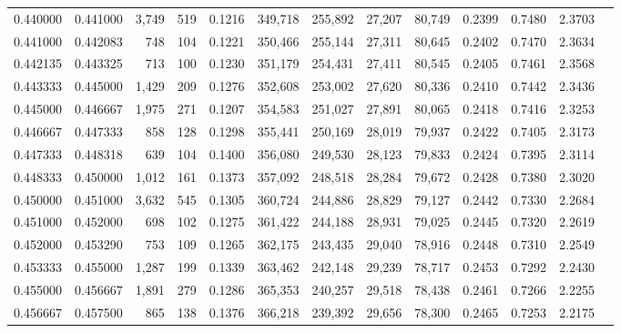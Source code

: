 \begin{tabular}{rrrrrrrrrrrrr}
0.440000 & 0.441000 & 3,749 & 519 &                                     0.1216 & 349,718 & 255,892 &  27,207 &  80,749 & 0.2399 & 0.7480 & 2.3703 \\
0.441000 & 0.442083 &   748 & 104 &                                     0.1221 & 350,466 & 255,144 &  27,311 &  80,645 & 0.2402 & 0.7470 & 2.3634 \\
0.442135 & 0.443325 &   713 & 100 &                                     0.1230 & 351,179 & 254,431 &  27,411 &  80,545 & 0.2405 & 0.7461 & 2.3568 \\
0.443333 & 0.445000 & 1,429 & 209 &                                     0.1276 & 352,608 & 253,002 &  27,620 &  80,336 & 0.2410 & 0.7442 & 2.3436 \\
0.445000 & 0.446667 & 1,975 & 271 &                                     0.1207 & 354,583 & 251,027 &  27,891 &  80,065 & 0.2418 & 0.7416 & 2.3253 \\
0.446667 & 0.447333 &   858 & 128 &                                     0.1298 & 355,441 & 250,169 &  28,019 &  79,937 & 0.2422 & 0.7405 & 2.3173 \\
0.447333 & 0.448318 &   639 & 104 &                                     0.1400 & 356,080 & 249,530 &  28,123 &  79,833 & 0.2424 & 0.7395 & 2.3114 \\
0.448333 & 0.450000 & 1,012 & 161 &                                     0.1373 & 357,092 & 248,518 &  28,284 &  79,672 & 0.2428 & 0.7380 & 2.3020 \\
0.450000 & 0.451000 & 3,632 & 545 &                                     0.1305 & 360,724 & 244,886 &  28,829 &  79,127 & 0.2442 & 0.7330 & 2.2684 \\
0.451000 & 0.452000 &   698 & 102 &                                     0.1275 & 361,422 & 244,188 &  28,931 &  79,025 & 0.2445 & 0.7320 & 2.2619 \\
0.452000 & 0.453290 &   753 & 109 &                                     0.1265 & 362,175 & 243,435 &  29,040 &  78,916 & 0.2448 & 0.7310 & 2.2549 \\
0.453333 & 0.455000 & 1,287 & 199 &                                     0.1339 & 363,462 & 242,148 &  29,239 &  78,717 & 0.2453 & 0.7292 & 2.2430 \\
0.455000 & 0.456667 & 1,891 & 279 &                                     0.1286 & 365,353 & 240,257 &  29,518 &  78,438 & 0.2461 & 0.7266 & 2.2255 \\
0.456667 & 0.457500 &   865 & 138 &                                     0.1376 & 366,218 & 239,392 &  29,656 &  78,300 & 0.2465 & 0.7253 & 2.2175 \\

\end{tabular}
